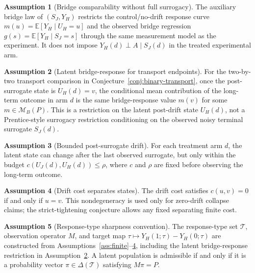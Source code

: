 \documentclass[11pt]{article}
\newcommand{\E}{\mathbb{E}}
\theoremstyle{definition}
\newtheorem{assumption}{Assumption}
\theoremstyle{plain}
\theoremstyle{remark}
\begin{document}
\begin{assumption}[Bridge comparability without full surrogacy]\label{ass:bridge}
The auxiliary bridge law of \((S_J,Y_H)\) restricts the control/no-drift response curve \(m(u)=\E[Y_H\mid U_H=u]\) and the observed bridge regression \(g(s)=\E[Y_H\mid S_J=s]\) through the same measurement model as the experiment.  It does not impose \(Y_H(d)\perp A\mid S_J(d)\) in the treated experimental arm.
\end{assumption}

\begin{assumption}[Latent bridge-response for transport endpoints]\label{ass:bridge-response}
For the two-by-two transport comparison in Conjecture~\ref{conj:binary-transport}, once the post-surrogate state is \(U_H(d)=v\), the conditional mean contribution of the long-term outcome in arm \(d\) is the same bridge-response value \(m(v)\) for some \(m\in\mathcal{M}_B(P)\).  This is a restriction on the latent post-drift state \(U_H(d)\), not a Prentice-style surrogacy restriction conditioning on the observed noisy terminal surrogate \(S_J(d)\).
\end{assumption}

\begin{assumption}[Bounded post-surrogate drift]\label{ass:drift}
For each treatment arm \(d\), the latent state can change after the last observed surrogate, but only within the budget \(c(U_J(d),U_H(d))\le\rho\), where \(c\) and \(\rho\) are fixed before observing the long-term outcome.
\end{assumption}

\begin{assumption}[Drift cost separates states]\label{ass:cost-separation}
The drift cost satisfies \(c(u,v)=0\) if and only if \(u=v\).  This nondegeneracy is used only for zero-drift collapse claims; the strict-tightening conjecture allows any fixed separating finite cost.
\end{assumption}

\begin{assumption}[Response-type sharpness convention]\label{ass:response-types}
The response-type set \(\mathcal{T}\), observation operator \(M\), and target map \(\tau\mapsto Y_H(1;\tau)-Y_H(0;\tau)\) are constructed from Assumptions~\ref{ass:finite}--\ref{ass:cost-separation}, including the latent bridge-response restriction in Assumption~\ref{ass:bridge-response}.  A latent population is admissible if and only if it is a probability vector \(\pi\in\Delta(\mathcal{T})\) satisfying \(M\pi=P\).
\end{assumption}
\end{document}
